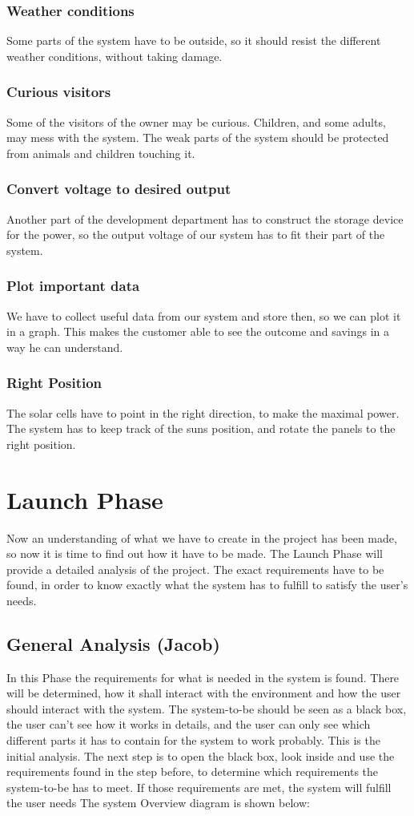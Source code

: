 \documentclass[12pt,a4paper]{report}
\begin{document}
\subsubsection{Weather conditions}
Some parts of the system have to be outside, so it should resist the different weather conditions, without taking damage.
\subsubsection{Curious visitors}
Some of the visitors of the owner may be curious. Children, and some adults, may mess with the system. The weak parts of the system should be protected from animals and children touching it.
\subsubsection{Convert voltage to desired output}
Another part of the development department has to construct the storage device for the power, so the output voltage of our system has to fit their part of the system.
\subsubsection{Plot important data}
We have to collect useful data from our system and store then, so we can plot it in a graph. This makes the customer able to see the outcome and savings in a way he can understand.
\subsubsection{Right Position}
The solar cells have to point in the right direction, to make the maximal power. The system has to keep track of the suns position, and rotate the panels to the right position.
\section{Launch Phase}
Now an understanding of what we have to create in the project has been made, so now it is time to find out how it have to be made. The Launch Phase will provide a detailed analysis of the project. The exact requirements have to be found, in order to know exactly what the system has to fulfill to satisfy the user’s needs.
\subsection{General Analysis (Jacob)}
In this Phase the requirements for what is needed in the system is found. There will be determined, how it shall interact with the environment and how the user should interact with the system. The system-to-be should be seen as a black box, the user can’t see how it works in details, and the user can only see which different parts it has to contain for the system to work probably. This is the initial analysis.
The next step is to open the black box, look inside and use the requirements found in the step before, to determine which requirements the system-to-be has to meet. If those requirements are met, the system will fulfill the user needs
The system Overview diagram is shown below:
\end{document}
